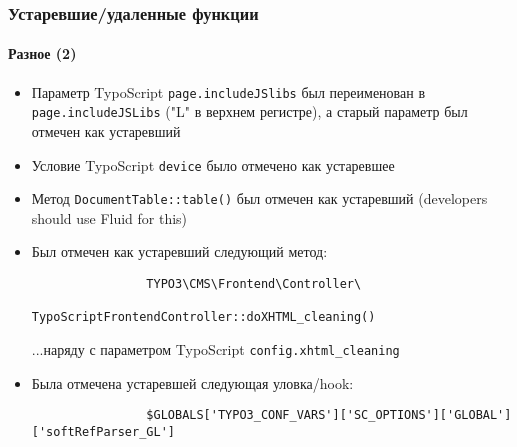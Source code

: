 \begin{frame}[fragile]
	\frametitle{Устаревшие/удаленные функции}
	\framesubtitle{Разное (2)}

	\begin{itemize}
		\item Параметр TypoScript \texttt{page.includeJSlibs} был переименован в\newline
			\texttt{page.includeJSLibs} ("L" в верхнем регистре), а старый параметр был отмечен как устаревший

		\item Условие TypoScript \texttt{device} было отмечено как устаревшее

		\item Метод \texttt{DocumentTable::table()} был отмечен как устаревший\newline
			\small(developers should use Fluid for this)\normalsize

		\item Был отмечен как устаревший следующий метод:
			\begin{lstlisting}
				TYPO3\CMS\Frontend\Controller\
				    TypoScriptFrontendController::doXHTML_cleaning()
			\end{lstlisting}
			...наряду с параметром TypoScript
			\small
				\texttt{config.xhtml\_cleaning}
			\normalsize

		\item Была отмечена устаревшей следующая уловка/hook:
			\begin{lstlisting}
				$GLOBALS['TYPO3_CONF_VARS']['SC_OPTIONS']['GLOBAL']['softRefParser_GL']
			\end{lstlisting}
 
	\end{itemize}

\end{frame}


